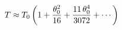 \documentclass[preview]{standalone}
\begin{document}
\begin{align*}
\special{dvisvgm:raw <g id='unique000'>}T \approx T_0 \left(1 + \frac{\theta_0^2}{16} + \frac{11\,\theta_0^4}{3072} + \cdots\right)\special{dvisvgm:raw </g>}
\end{align*}
\end{document}
